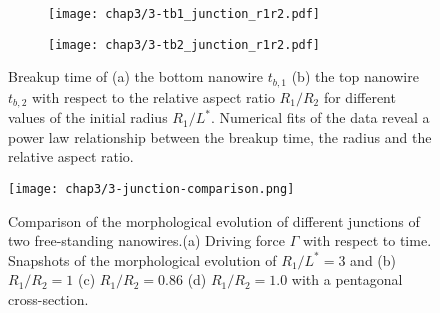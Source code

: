 \begin{figure}[H]
    \centering
    \begin{subfigure}{0.5\textwidth}
        \centering
        \texttt{[image: chap3/3-tb1\_junction\_r1r2.pdf]}
        \caption{}
    \end{subfigure}%
    \begin{subfigure}{0.5\textwidth}
        \centering
        \texttt{[image: chap3/3-tb2\_junction\_r1r2.pdf]}
        \caption{}
    \end{subfigure}
    \caption{Breakup time of (a) the bottom nanowire $t_{b,1 }$ (b) the top nanowire $t_{b,2}$ with respect to the relative aspect ratio $R_1/R_2$ for different values of the initial radius $R_1/L^*$. Numerical fits of the data reveal a power law relationship between the breakup time, the radius and the relative aspect ratio.}
    \label{fig:3-morph-junction-dependence}
\end{figure}
\begin{figure}[H]
    \centering
    \texttt{[image: chap3/3-junction-comparison.png]}
    \caption{Comparison of the morphological evolution of different junctions of two free-standing nanowires.(a) Driving force $\Gamma$ with respect to time. Snapshots of the morphological evolution of $R_1/L^*=3$ and (b) $R_1/R_2=1$ (c) $R_1/R_2=0.86$ (d) $R_1/R_2=1.0$ with a pentagonal cross-section.}
    \label{fig:3-morph-junction-dependence3}
\end{figure}

